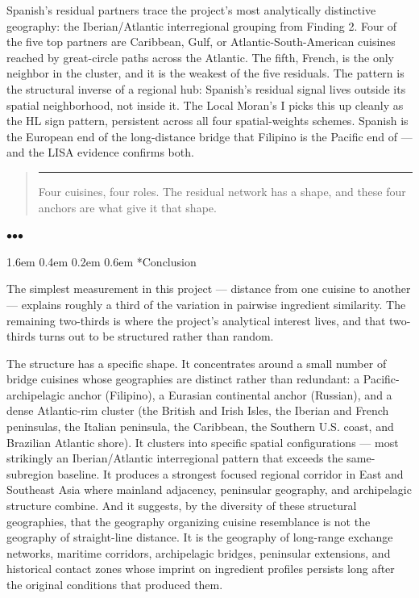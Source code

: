 \documentclass[11pt]{article}
\makeatletter
\renewcommand\section{\@startsection{section}{1}{\z@}%
  {1.6em \@plus 0.4em \@minus 0.2em}%
  {0.6em}%
  {\normalfont\Large\bfseries\color{black!85}}}
\newenvironment{pullquote}
  {\begin{quote}\itshape\color{black!72}\hspace*{-0.4em}\rule{2pt}{1em}\hspace{0.6em}}
  {\end{quote}}
\newcommand{\sectionbreak}{%
  \par\nobreak\vspace{0.8em}%
  \par\centerline{\textcolor{black!40}{$\bullet$\quad$\bullet$\quad$\bullet$}}%
  \par\vspace{0.6em}\nobreak%
}
\makeatother
\begin{document}
Spanish's residual partners trace the project's most analytically distinctive geography: the Iberian/Atlantic interregional grouping from Finding 2. Four of the five top partners are Caribbean, Gulf, or Atlantic-South-American cuisines reached by great-circle paths across the Atlantic. The fifth, French, is the only neighbor in the cluster, and it is the weakest of the five residuals. The pattern is the structural inverse of a regional hub: Spanish's residual signal lives outside its spatial neighborhood, not inside it. The Local Moran's I picks this up cleanly as the HL sign pattern, persistent across all four spatial-weights schemes. Spanish is the European end of the long-distance bridge that Filipino is the Pacific end of — and the LISA evidence confirms both.


\begin{pullquote}
Four cuisines, four roles. The residual network has a shape, and these four anchors are what give it that shape.
\end{pullquote}


\sectionbreak


\section*{Conclusion}


The simplest measurement in this project — distance from one cuisine to another — explains roughly a third of the variation in pairwise ingredient similarity. The remaining two-thirds is where the project's analytical interest lives, and that two-thirds turns out to be structured rather than random.


The structure has a specific shape. It concentrates around a small number of bridge cuisines whose geographies are distinct rather than redundant: a Pacific-archipelagic anchor (Filipino), a Eurasian continental anchor (Russian), and a dense Atlantic-rim cluster (the British and Irish Isles, the Iberian and French peninsulas, the Italian peninsula, the Caribbean, the Southern U.S. coast, and Brazilian Atlantic shore). It clusters into specific spatial configurations — most strikingly an Iberian/Atlantic interregional pattern that exceeds the same-subregion baseline. It produces a strongest focused regional corridor in East and Southeast Asia where mainland adjacency, peninsular geography, and archipelagic structure combine. And it suggests, by the diversity of these structural geographies, that the geography organizing cuisine resemblance is not the geography of straight-line distance. It is the geography of long-range exchange networks, maritime corridors, archipelagic bridges, peninsular extensions, and historical contact zones whose imprint on ingredient profiles persists long after the original conditions that produced them.
\end{document}
